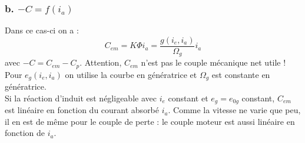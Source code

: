 		\subsubsection{b. $-C = f(i_a)$}
		Dans ce cas-ci on a : 
		\begin{equation}
		C_{em} = K\Phi i_a = \dfrac{g(i_e,i_a)}{\Omega_g}i_a
		\end{equation}
		avec $-C = C_{em}-C_p$. Attention, $C_{em}$ n'est pas le couple mécanique net utile ! 
		Pour $e_g(i_e,i_a)$ on utilise la courbe en génératrice et $\Omega_g$ est constante 
		en génératrice. \\
		Si la réaction d'induit est négligeable avec $i_e$ constant et $e_g=e_{0g}$ constant, 
		$C_{em}$ est linéaire en fonction du courant absorbé $i_a$. Comme la vitesse ne varie 
		que peu, il en est de même pour le couple de perte : le couple moteur est aussi linéaire 
		en fonction de $i_a$.
	

	
	
	
	
	
	
	
	
	
	
	
	
	
	
	
	
	
	
	
	
	
	
	
	
	
	
	
	
	
	
	
	
	
		
		
